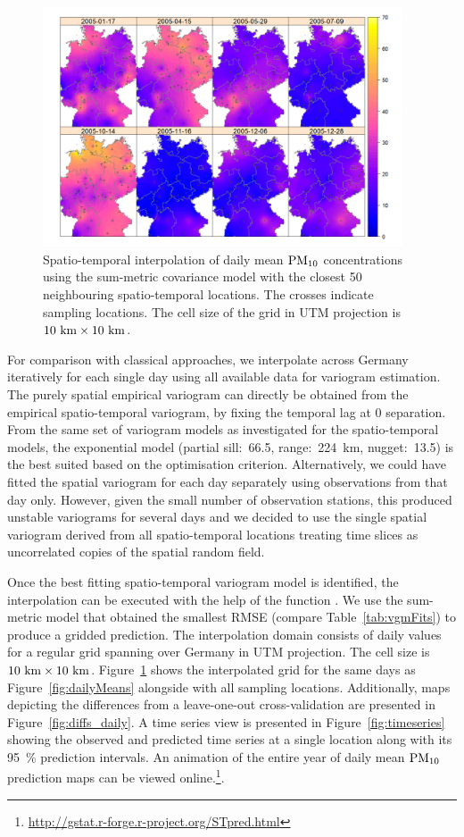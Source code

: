 \begin{figure}[b!]
\centering
\includegraphics[width=0.95\textwidth]{pred_daily_means_PM10.png}
\caption{Spatio-temporal interpolation of daily mean $\rm{PM}_{10}$ concentrations using the sum-metric covariance model with the closest 50 neighbouring spatio-temporal locations. The crosses indicate sampling locations. The cell size of the grid in UTM projection is $10~\rm{km}\times10~\rm{km}$.}\label{fig:pred_daily}
\end{figure}

For comparison with classical approaches, we interpolate across Germany iteratively for each single day using all available data for variogram estimation. The purely spatial empirical variogram can directly be obtained from the empirical spatio-temporal variogram, by fixing the temporal lag at 0 separation. From the same set of variogram models as investigated for the spatio-temporal models, the exponential model (partial sill:~66.5, range:~224~km, nugget:~13.5) is the best suited based on the optimisation criterion. Alternatively, we could have fitted the spatial variogram for each day separately using observations from that day only. However, given the small number of observation stations, this produced unstable variograms for several days and we decided to use the single spatial variogram derived from all spatio-temporal locations treating time slices as uncorrelated copies of the spatial random field.

Once the best fitting spatio-temporal variogram model is identified, the interpolation can be executed with the help of the function . We use the sum-metric model that obtained the smallest RMSE (compare Table~\ref{tab:vgmFits}) to produce a gridded prediction. The interpolation domain consists of daily values for a regular grid spanning over Germany in UTM projection. The cell size is $10~\rm{km}\times10~\rm{km}$. Figure~\ref{fig:pred_daily} shows the interpolated grid for the same days as Figure~\ref{fig:dailyMeans} alongside with all sampling locations. Additionally, maps depicting the differences from a leave-one-out cross-validation are presented in Figure~\ref{fig:diffs_daily}. A time series view is presented in Figure~\ref{fig:timeseries} showing the observed and predicted time series at a single location along with its 95~\% prediction intervals. An animation of the entire year of daily mean ${\rm PM}_{10}$ prediction maps can be viewed online.\footnote{\url{http://gstat.r-forge.r-project.org/STpred.html}}.

